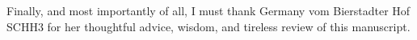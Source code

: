\documentclass[12pt,twoside]{report}
\begin{document}
Finally, and most importantly of all, I must thank Germany vom Bierstadter Hof SCHH3 for her thoughtful advice, wisdom, and tireless review of this manuscript.


\tableofcontents

\listoftables

\listoffigures

 













\end{document}

